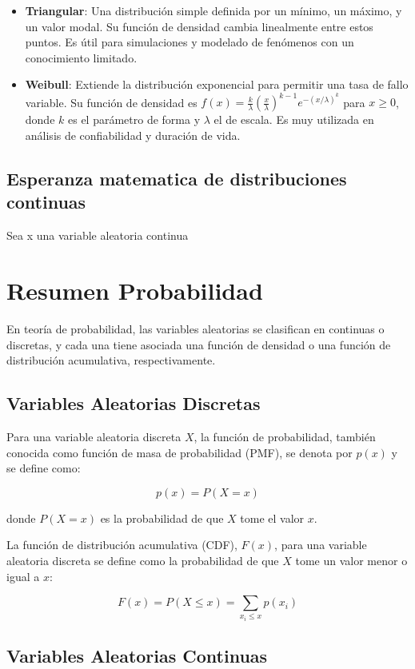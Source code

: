 \documentclass{article}
\begin{document}
\begin{itemize}
    \item \textbf{Triangular}: Una distribución simple definida por un mínimo, un máximo, y un valor modal. Su función de densidad cambia linealmente entre estos puntos. Es útil para simulaciones y modelado de fenómenos con un conocimiento limitado.

    \item \textbf{Weibull}: Extiende la distribución exponencial para permitir una tasa de fallo variable. Su función de densidad es $f(x) = \frac{k}{\lambda} \left( \frac{x}{\lambda} \right)^{k-1} e^{-(x/\lambda)^k}$ para $x \geq 0$, donde $k$ es el parámetro de forma y $\lambda$ el de escala. Es muy utilizada en análisis de confiabilidad y duración de vida.
\end{itemize}

\subsection{Esperanza matematica de distribuciones continuas}

Sea x una variable aleatoria continua

\section*{Resumen Probabilidad}

En teoría de probabilidad, las variables aleatorias se clasifican en continuas o discretas, y cada una tiene asociada una función de densidad o una función de distribución acumulativa, respectivamente.

\subsection*{Variables Aleatorias Discretas}

Para una variable aleatoria discreta \(X\), la función de probabilidad, también conocida como función de masa de probabilidad (PMF), se denota por \(p(x)\) y se define como:

\[ p(x) = P(X = x) \]

donde \(P(X = x)\) es la probabilidad de que \(X\) tome el valor \(x\).

La función de distribución acumulativa (CDF), \(F(x)\), para una variable aleatoria discreta se define como la probabilidad de que \(X\) tome un valor menor o igual a \(x\):

\[ F(x) = P(X \leq x) = \sum_{x_i \leq x} p(x_i) \]

\subsection*{Variables Aleatorias Continuas}
\end{document}
